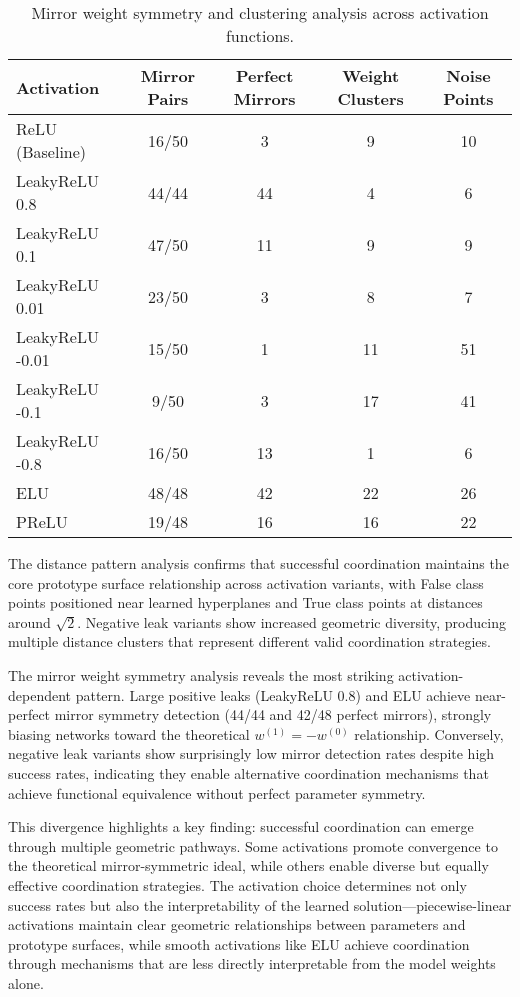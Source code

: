 \begin{table}[ht]
\centering
\caption{Mirror weight symmetry and clustering analysis across activation functions.}
\label{tab:relu1-activation-symmetry}
\begin{tabular}{lcccc}
\toprule
Activation & Mirror Pairs & Perfect Mirrors & Weight Clusters & Noise Points \\
\midrule
ReLU (Baseline) & 16/50 & 3 & 9 & 10 \\
LeakyReLU 0.8 & 44/44 & 44 & 4 & 6 \\
LeakyReLU 0.1 & 47/50 & 11 & 9 & 9 \\
LeakyReLU 0.01 & 23/50 & 3 & 8 & 7 \\
LeakyReLU -0.01 & 15/50 & 1 & 11 & 51 \\
LeakyReLU -0.1 & 9/50 & 3 & 17 & 41 \\
LeakyReLU -0.8 & 16/50 & 13 & 1 & 6 \\
ELU & 48/48 & 42 & 22 & 26 \\
PReLU & 19/48 & 16 & 16 & 22 \\
\bottomrule
\end{tabular}
\end{table}

The distance pattern analysis confirms that successful coordination maintains the core prototype surface relationship across activation variants, with False class points positioned near learned hyperplanes and True class points at distances around $\sqrt{2}$. Negative leak variants show increased geometric diversity, producing multiple distance clusters that represent different valid coordination strategies.

The mirror weight symmetry analysis reveals the most striking activation-dependent pattern. Large positive leaks (LeakyReLU 0.8) and ELU achieve near-perfect mirror symmetry detection (44/44 and 42/48 perfect mirrors), strongly biasing networks toward the theoretical $w^{(1)} = -w^{(0)}$ relationship. Conversely, negative leak variants show surprisingly low mirror detection rates despite high success rates, indicating they enable alternative coordination mechanisms that achieve functional equivalence without perfect parameter symmetry.

This divergence highlights a key finding: successful coordination can emerge through multiple geometric pathways. Some activations promote convergence to the theoretical mirror-symmetric ideal, while others enable diverse but equally effective coordination strategies. The activation choice determines not only success rates but also the interpretability of the learned solution—piecewise-linear activations maintain clear geometric relationships between parameters and prototype surfaces, while smooth activations like ELU achieve coordination through mechanisms that are less directly interpretable from the model weights alone.

